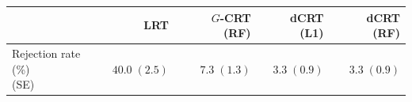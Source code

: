 \begin{tabular*}{\linewidth}{@{\extracolsep{\fill}}lrrrr@{}}
\hline
& LRT & $G$-CRT (RF) & dCRT (L1) & dCRT (RF) \\
\hline
\shortstack[l]{Rejection rate (\%)\\(SE)} & $40.0\;(2.5)$ & $7.3\;(1.3)$ & $3.3\;(0.9)$ & $3.3\;(0.9)$ \\
\hline
\end{tabular*}

